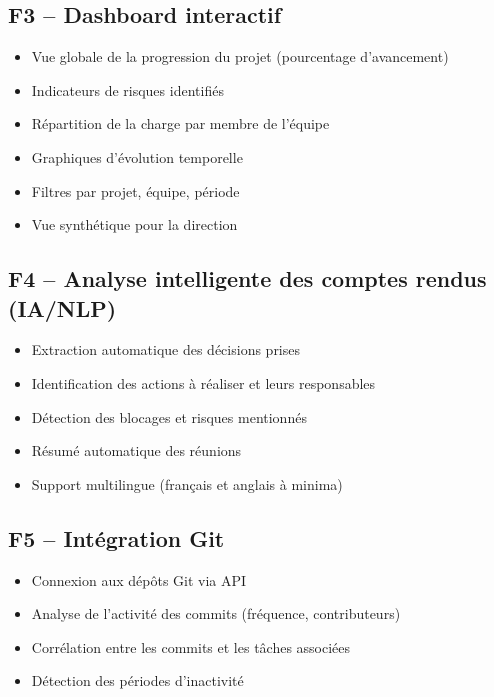 \documentclass[12pt,a4paper]{article}
\begin{document}
\subsection{F3 -- Dashboard interactif}
\begin{itemize}[leftmargin=2cm, itemsep=3pt]
    \item[\textcolor{accent}{$\blacktriangleright$}] Vue globale de la progression du projet (pourcentage d'avancement)
    \item[\textcolor{accent}{$\blacktriangleright$}] Indicateurs de risques identifi\'es
    \item[\textcolor{accent}{$\blacktriangleright$}] R\'epartition de la charge par membre de l'\'equipe
    \item[\textcolor{accent}{$\blacktriangleright$}] Graphiques d'\'evolution temporelle
    \item[\textcolor{accent}{$\blacktriangleright$}] Filtres par projet, \'equipe, p\'eriode
    \item[\textcolor{accent}{$\blacktriangleright$}] Vue synth\'etique pour la direction
\end{itemize}

\subsection{F4 -- Analyse intelligente des comptes rendus (IA/NLP)}
\begin{itemize}[leftmargin=2cm, itemsep=3pt]
    \item[\textcolor{accent}{$\blacktriangleright$}] Extraction automatique des d\'ecisions prises
    \item[\textcolor{accent}{$\blacktriangleright$}] Identification des actions \`a r\'ealiser et leurs responsables
    \item[\textcolor{accent}{$\blacktriangleright$}] D\'etection des blocages et risques mentionn\'es
    \item[\textcolor{accent}{$\blacktriangleright$}] R\'esum\'e automatique des r\'eunions
    \item[\textcolor{accent}{$\blacktriangleright$}] Support multilingue (fran\c{c}ais et anglais \`a minima)
\end{itemize}

\subsection{F5 -- Int\'egration Git}
\begin{itemize}[leftmargin=2cm, itemsep=3pt]
    \item[\textcolor{accent}{$\blacktriangleright$}] Connexion aux d\'ep\^ots Git via API
    \item[\textcolor{accent}{$\blacktriangleright$}] Analyse de l'activit\'e des commits (fr\'equence, contributeurs)
    \item[\textcolor{accent}{$\blacktriangleright$}] Corr\'elation entre les commits et les t\^aches associ\'ees
    \item[\textcolor{accent}{$\blacktriangleright$}] D\'etection des p\'eriodes d'inactivit\'e
\end{itemize}
\end{document}
